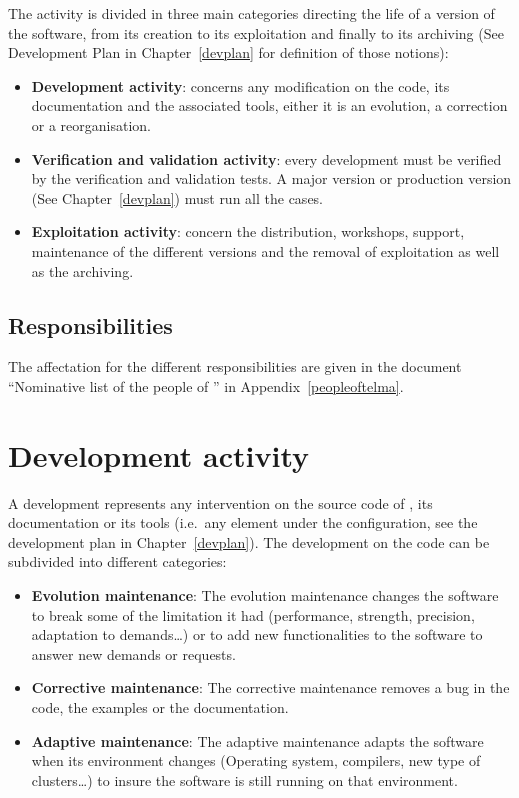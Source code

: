 The \telemacsystem{} activity is divided in three main categories directing the
life of a version of the software, from its creation to its exploitation and
finally to its archiving (See Development Plan in Chapter~\ref{devplan} for
definition of those notions):
\begin{itemize}
\item \textbf{Development activity}: concerns any modification on the code, its
  documentation and the associated tools, either it is an evolution, a
  correction or a reorganisation.
\item \textbf{Verification and validation activity}: every development must be
  verified by the verification and validation tests. A major version or
  production version (See Chapter~\ref{devplan}) must run all the cases.
\item \textbf{Exploitation activity}: concern the distribution, workshops,
  support, maintenance of the different versions and the removal of exploitation
  as well as the archiving.
\end{itemize}

\subsection{Responsibilities}

The affectation for the different responsibilities are given in the document
``Nominative list of the people of \telemacsystem'' in
Appendix~\ref{peopleoftelma}.

\section{Development activity}
\label{devact}

A development represents any intervention on the source code of \telemacsystem,
its documentation or its tools (i.e.\ any element under the configuration, see
the development plan in Chapter~\ref{devplan}). The development on the code can
be subdivided into different categories:
\begin{itemize}
\item \textbf{Evolution maintenance}: The evolution maintenance changes the
  software to break some of the limitation it had (performance, strength,
  precision, adaptation to demands\ldots) or to add new functionalities to the
  software to answer new demands or requests.
\item \textbf{Corrective maintenance}: The corrective maintenance removes a bug
  in the code, the examples or the documentation.
\item \textbf{Adaptive maintenance}: The adaptive maintenance adapts the
  software when its environment changes (Operating system, compilers, new type
  of clusters\ldots) to insure the software is still running on that
  environment.
\end{itemize}


